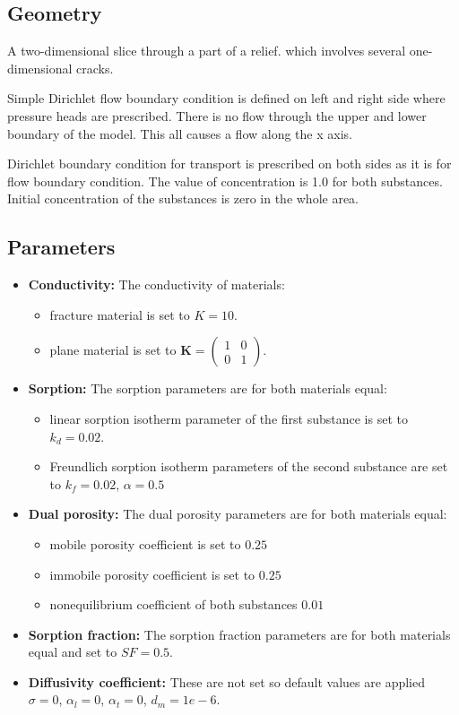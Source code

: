 \subsection*{Geometry}
A two-dimensional slice through a part of a relief. which involves several one-dimensional cracks.

Simple Dirichlet flow boundary condition is defined on left and right side where pressure heads are prescribed. There is no flow through the upper and lower boundary of the model. This all causes a flow along the x axis.

Dirichlet boundary condition for transport is prescribed on both sides as it is for flow boundary condition. The value of concentration is 1.0 for both substances. Initial concentration of the substances is zero in the whole area. 

\subsection*{Parameters}
\begin{itemize}
  \item \textbf{Conductivity:} The conductivity of materials:
    \begin{itemize}
      \item fracture material is set to $K=10$.
      \item plane material is set to $\mathbf{K}=\left(\begin{array}{cc} 1 & 0 \\ 0 & 1\end{array} \right)$.
    \end{itemize}
  \item \textbf{Sorption:} The sorption parameters are for both materials equal:
    \begin{itemize}
      \item linear sorption isotherm parameter of the first substance is set to $k_d=0.02$.
      \item Freundlich sorption isotherm parameters of the second substance are set to $k_f=0.02$, $\alpha=0.5$  
    \end{itemize}
  \item \textbf{Dual porosity:} The dual porosity parameters are for both materials equal:
    \begin{itemize}
      \item mobile porosity coefficient is set to $0.25$
      \item immobile porosity coefficient is set to $0.25$
      \item nonequilibrium coefficient of both substances $0.01$
    \end{itemize}
  \item \textbf{Sorption fraction:} The sorption fraction parameters are for both materials equal and set to $SF=0.5$.
  \item \textbf{Diffusivity coefficient:} These are not set so default values are applied 
	$\sigma=0$, $\alpha_l=0$, $\alpha_t=0$, $d_m=1e-6$.
\end{itemize}

